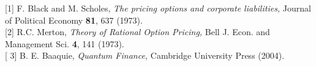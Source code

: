 \documentclass[portrait, a0b,final]{a0poster}%
\numberwithin{equation}{section}
\newenvironment{poster}{
  \begin{center}
  \begin{minipage}[c]{0.98\textwidth}
}{
  \end{minipage}
  \end{center}
}
\newenvironment{pcolumn}[1]{
  \begin{minipage}{#1\textwidth}
  \begin{center}
}{
  \end{center}
  \end{minipage}
}
\begin{document}
\begin{poster}
\begin{center}
\begin{pcolumn}{0.32}
{%


[1] F. Black and  M. Scholes, {\it The pricing options and corporate liabilities,} Journal of Political Economy  {\bf 81},  637 (1973).\\
 
[2] R.C. Merton, {\it Theory of Rational Option Pricing,}  Bell J. Econ. and Management Sci.   {\bf 4},  141 (1973).\\

[ 3] B. E. Baaquie,  {\it Quantum Finance,} Cambridge University Press (2004).



}
\end{pcolumn}
\end{center}




\end{poster}
\end{document}
